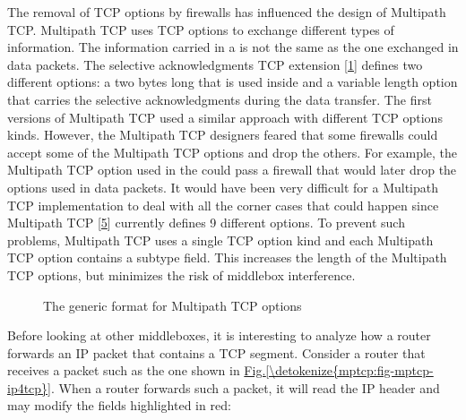 \documentclass[letterpaper,10pt,english]{sphinxmanual}
\begin{document}
\sphinxAtStartPar
The removal of TCP options by firewalls has influenced the design of Multipath TCP. Multipath TCP uses TCP options to exchange different types of information. The information carried in a  is not the same as the one exchanged in data packets. The selective acknowledgments TCP extension {[}\hyperlink{cite.biblio:id1948}{1}{]} defines two different options: a two bytes long  that is used inside  and a variable length  option that carries the selective acknowledgments during the data transfer. The first versions of Multipath TCP used a similar approach with different TCP options kinds. However, the Multipath TCP designers feared that some firewalls could accept some of the Multipath TCP options and drop the others. For example, the Multipath TCP option used in the  could pass a firewall that would later drop the options used in data packets. It would have been very difficult for a Multipath TCP implementation to deal with all the corner cases that could happen since Multipath TCP {[}\hyperlink{cite.biblio:id8500}{5}{]} currently defines 9 different options. To prevent such problems, Multipath TCP uses a single TCP option kind and each Multipath TCP option contains a subtype field. This increases the length of the Multipath TCP options, but minimizes the risk of middlebox interference.
\begin{figure}[htbp]\centering\capstart{}\caption{The generic format for Multipath TCP options}\label{\detokenize{mptcp:id77}}\label{\detokenize{mptcp:fig-mptcp-tcp-option2}}\end{figure}
\sphinxAtStartPar
Before looking at other middleboxes, it is interesting to analyze how a router forwards an IP packet that contains a TCP segment. Consider a router that receives a packet such as the one shown in \hyperref[\detokenize{mptcp:fig-mptcp-ip4tcp}]{Fig.\@ \ref{\detokenize{mptcp:fig-mptcp-ip4tcp}}}. When a router forwards such a packet, it will read the IP header and may modify the fields highlighted in red:
\end{document}
